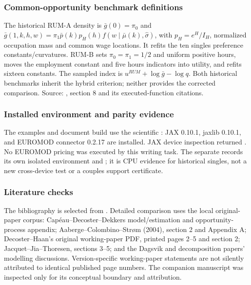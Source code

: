 \documentclass[11pt,a4paper]{article}
\begin{document}
\subsubsection{Common-opportunity benchmark definitions}\label{common-opportunity-benchmark-definitions}

The historical RUM-A density is \(\bar g(0)=\pi_0\) and \(\bar g(1,k,h,w)=\pi_1\bar p(k)p_H(h)f(w\mid\bar\mu(k),\widehat\sigma)\), with \(p_H=e^{H}/I_H\), normalized occupation mass and common wage locations. It refits the ten singles preference constants/curvatures. RUM-B sets \(\pi_0=\pi_1=1/2\) and uniform positive hours, moves the employment constant and five hours indicators into utility, and refits sixteen constants. The sampled index is \(u^{RUM}+\log\bar g-\log q\). Both historical benchmarks inherit the hybrid criterion; neither provides the corrected comparison. Source: , section 8 and its executed-function citations.

\subsubsection{Installed environment and parity evidence}\label{installed-environment-and-parity-evidence}

The examples and document build use the scientific : JAX 0.10.1, jaxlib 0.10.1, and EUROMOD connector 0.2.17 are installed. JAX device inspection returned . No EUROMOD pricing was executed by this writing task. The separate  records its own isolated environment and ; it is CPU evidence for historical singles, not a new cross-device test or a couples support certificate.

\subsubsection{Literature checks}\label{literature-checks}

The bibliography is selected from . Detailed comparison uses the local original-paper corpus: Capéau--Decoster--Dekkers model/estimation and opportunity-process appendix; Aaberge--Colombino--Strøm (2004), section 2 and Appendix A; Decoster--Haan's original working-paper PDF, printed pages 2--5 and section 2; Jacquet--Jia--Thoresen, sections 3--5; and the Dagsvik and decomposition papers' modelling discussions. Version-specific working-paper statements are not silently attributed to identical published page numbers. The companion manuscript was inspected only for its conceptual boundary and attribution.



\end{document}
